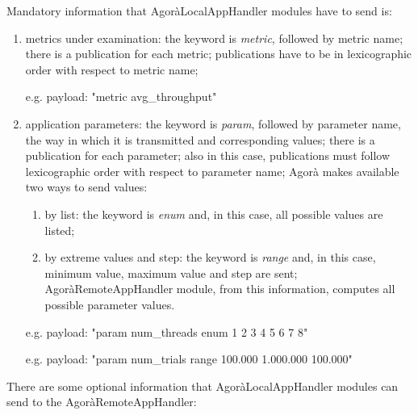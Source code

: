 Mandatory information that AgoràLocalAppHandler modules have to send is:

\begin{enumerate}

    \item metrics under examination: the keyword is \textit{metric}, followed by metric name; there is a publication for each metric; publications have to be in lexicographic order with respect to metric name;
    
    e.g. payload: "metric avg\_throughput"
    
    \item application parameters: the keyword is \textit{param}, followed by parameter name, the way in which it is transmitted and corresponding values; there is a publication for each parameter; also in this case, publications must follow lexicographic order with respect to parameter name; Agorà makes available two ways to send values:
    
    \begin{enumerate}
    
        \item by list: the keyword is \textit{enum} and, in this case, all possible values are listed;
        
        \item by extreme values and step: the keyword is \textit{range} and, in this case, minimum value, maximum value and step are sent; AgoràRemoteAppHandler module, from this information, computes all possible parameter values.
    
    \end{enumerate}
    
    e.g. payload: "param num\_threads enum 1 2 3 4 5 6 7 8"
    
    e.g. payload: "param num\_trials range 100.000 1.000.000 100.000"

\end{enumerate}

There are some optional information that AgoràLocalAppHandler modules can send to the AgoràRemoteAppHandler:


